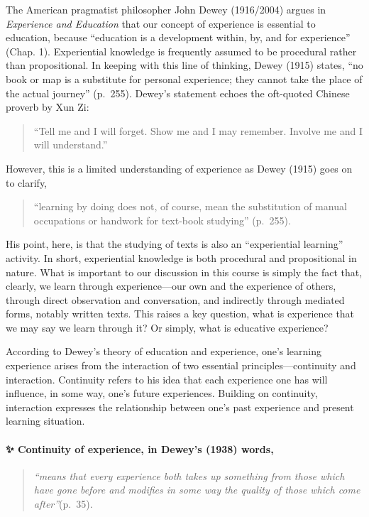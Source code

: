 \documentclass[
]{book}
\begin{document}
The American pragmatist philosopher John Dewey (1916/2004) argues in \emph{Experience and Education} that our concept of experience is essential to education, because ``education is a development within, by, and for experience'' (Chap. 1). Experiential knowledge is frequently assumed to be procedural rather than propositional. In keeping with this line of thinking, Dewey (1915) states, ``no book or map is a substitute for personal experience; they cannot take the place of the actual journey'' (p.~255). Dewey's statement echoes the oft-quoted Chinese proverb by Xun Zi:

\begin{quote}
``Tell me and I will forget. Show me and I may remember. Involve me and I will understand.''
\end{quote}

However, this is a limited understanding of experience as Dewey (1915) goes on to clarify,

\begin{quote}
``learning by doing does not, of course, mean the substitution of manual occupations or handwork for text-book studying'' (p.~255).
\end{quote}

His point, here, is that the studying of texts is also an ``experiential learning'' activity. In short, experiential knowledge is both procedural and propositional in nature. What is important to our discussion in this course is simply the fact that, clearly, we learn through experience---our own and the experience of others, through direct observation and conversation, and indirectly through mediated forms, notably written texts. This raises a key question, what is experience that we may say we learn through it? Or simply, what is educative experience?

According to Dewey's theory of education and experience, one's learning experience arises from the interaction of two essential principles---continuity and interaction. Continuity refers to his idea that each experience one has will influence, in some way, one's future experiences. Building on continuity, interaction expresses the relationship between one's past experience and present learning situation.

\begin{protip}
\hypertarget{continuity-of-experience-in-deweys-1938-words}{%
\paragraph{✨ Continuity of experience, in Dewey's (1938)
words,}\label{continuity-of-experience-in-deweys-1938-words}}

\begin{quote}
\emph{``means that every experience both takes up something from those
which have gone before and modifies in some way the quality of those
which come after''}(p.~35).
\end{quote}
\end{protip}
\end{document}
